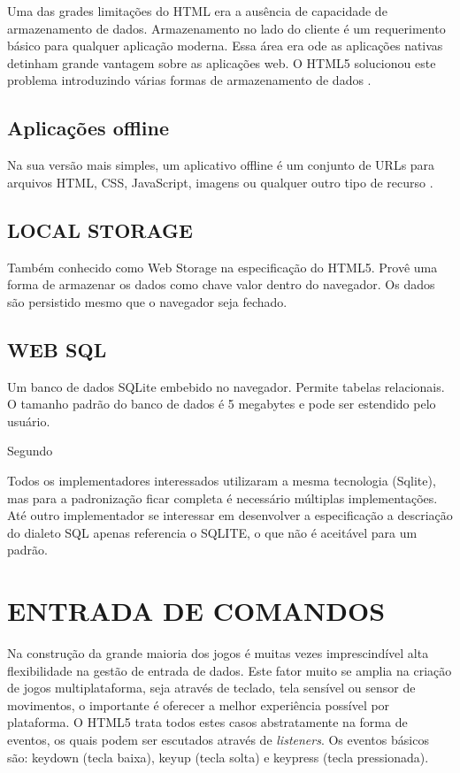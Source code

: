 \documentclass[
12pt,
a4paper,
portuges,
draft
]{report}
\renewenvironment{quote}
               {\list{}{\rightmargin\leftmargin}%
                \item\relax\fontsize{10}{12}}
               {\endlist}
\begin{document}
Uma das grades limitações do HTML era a ausência de capacidade
de armazenamento de dados. Armazenamento no lado do cliente é um
requerimento básico para qualquer aplicação moderna. Essa área
era ode as aplicações nativas detinham grande vantagem sobre as
aplicações web. O HTML5 solucionou este problema introduzindo várias
formas de armazenamento de dados \autocite{html5Tradeoffs}.

\subsection{Aplicações offline}
Na sua versão mais simples, um aplicativo offline é um conjunto de
URLs para arquivos HTML, CSS, JavaScript, imagens ou qualquer outro tipo
de recurso \autocite{diveIntohtml}.

\subsection{LOCAL STORAGE}
Também conhecido como Web Storage na especificação do HTML5. Provê
uma forma de armazenar os dados como chave valor dentro do navegador. Os
dados são persistido mesmo que o navegador seja fechado.

\subsection{WEB SQL}
Um banco de dados SQLite embebido no navegador. Permite
tabelas relacionais. O tamanho padrão do banco de dados é 5 megabytes
e pode ser estendido pelo usuário.

Segundo \cite{diveIntohtml}
\begin{quote}
Todos os implementadores interessados utilizaram a mesma tecnologia (Sqlite), mas
para a padronização ficar completa é necessário múltiplas implementações. Até outro implementador se interessar em desenvolver a especificação a descriação do dialeto SQL apenas referencia o SQLITE, o que não é aceitável para um padrão.
\end{quote}

\section{ENTRADA DE COMANDOS}

Na construção da grande maioria dos jogos é muitas vezes
imprescindível alta flexibilidade na gestão de entrada de dados.
Este fator muito se amplia na criação de jogos multiplataforma,
seja através de teclado, tela sensível ou sensor de movimentos, o
importante é oferecer a melhor experiência possível por plataforma.
O HTML5 trata todos estes casos abstratamente na forma de eventos, os
quais podem ser escutados através de \textit{listeners}. Os eventos básicos
são: keydown (tecla baixa), keyup (tecla solta) e keypress (tecla
pressionada).
\end{document}
